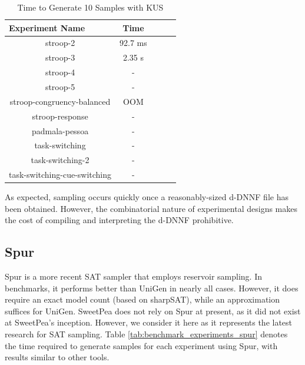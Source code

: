 \begin{table}[htb]
  \centering
  \caption{Time to Generate 10 Samples with KUS}
\begin{tabular}{|c|c|c|c|c|}
\hline
\multicolumn{1}{|l|}{Experiment Name} & Time        \\ \hline
stroop-2                              & 92.7 ms     \\ \hline
stroop-3                              & 2.35 s      \\ \hline
stroop-4                              & -           \\ \hline
stroop-5                              & -           \\ \hline
stroop-congruency-balanced            & OOM         \\ \hline  %
stroop-response                       & -           \\ \hline
padmala-pessoa                        & -           \\ \hline
task-switching                        & -           \\ \hline
task-switching-2                      & -           \\ \hline
task-switching-cue-switching          & -           \\ \hline
\end{tabular}
\label{tab:benchmark_experiments_kus}%
\end{table}

As expected, sampling occurs quickly once a reasonably-sized d-DNNF file has been obtained. However, the combinatorial nature of experimental designs makes the cost of compiling and interpreting the d-DNNF prohibitive.


\subsection{Spur}

Spur \cite{spur} is a more recent SAT sampler that employs reservoir sampling. In benchmarks, it performs better than UniGen in nearly all cases. However, it does require an exact model count (based on sharpSAT), while an approximation suffices for UniGen. SweetPea does not rely on Spur at present, as it did not exist at SweetPea's inception. However, we consider it here as it represents the latest research for SAT sampling. Table \ref{tab:benchmark_experiments_spur} denotes the time required to generate samples for each experiment using Spur, with results similar to other tools.

